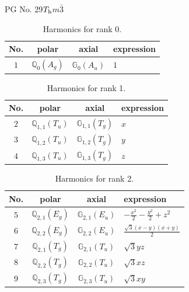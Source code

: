 \documentclass[fleqn,8pt,landscape]{jsarticle}
\begin{document}
\setcounter{MaxMatrixCols}{32}

\renewcommand{\tablename}{Table~}
\renewcommand{\figurename}{Figure~}
\begin{center}
\LARGE
PG No. 29\quad$T_{\rm h}$\quad$m\bar{3}$\quad[ cubic ]
\end{center}
\begin{table}[ht!]
\begin{center}
\caption{Harmonics for rank 0.}
\renewcommand{\arraystretch}{1.3}
\begin{tabular}{cccl} \hline \hline
No. & polar & axial & expression \\ \hline
$ 1 $ & $ \mathbb{Q}_{0}(A_{g}) $ & $ \mathbb{G}_{0}(A_{u}) $ & $ 1 $ \\
 \hline \hline
\end{tabular}
\end{center}
\end{table}
\begin{table}[ht!]
\begin{center}
\caption{Harmonics for rank 1.}
\renewcommand{\arraystretch}{1.3}
\begin{tabular}{cccl} \hline \hline
No. & polar & axial & expression \\ \hline
$ 2 $ & $ \mathbb{Q}_{1,1}(T_{u}) $ & $ \mathbb{G}_{1,1}(T_{g}) $ & $ x $ \\
$ 3 $ & $ \mathbb{Q}_{1,2}(T_{u}) $ & $ \mathbb{G}_{1,2}(T_{g}) $ & $ y $ \\
$ 4 $ & $ \mathbb{Q}_{1,3}(T_{u}) $ & $ \mathbb{G}_{1,3}(T_{g}) $ & $ z $ \\
 \hline \hline
\end{tabular}
\end{center}
\end{table}
\begin{table}[ht!]
\begin{center}
\caption{Harmonics for rank 2.}
\renewcommand{\arraystretch}{1.3}
\begin{tabular}{cccl} \hline \hline
No. & polar & axial & expression \\ \hline
$ 5 $ & $ \mathbb{Q}_{2,1}(E_{g}) $ & $ \mathbb{G}_{2,1}(E_{u}) $ & $ - \frac{x^{2}}{2} - \frac{y^{2}}{2} + z^{2} $ \\
$ 6 $ & $ \mathbb{Q}_{2,2}(E_{g}) $ & $ \mathbb{G}_{2,2}(E_{u}) $ & $ \frac{\sqrt{3} \left(x - y\right) \left(x + y\right)}{2} $ \\
$ 7 $ & $ \mathbb{Q}_{2,1}(T_{g}) $ & $ \mathbb{G}_{2,1}(T_{u}) $ & $ \sqrt{3} y z $ \\
$ 8 $ & $ \mathbb{Q}_{2,2}(T_{g}) $ & $ \mathbb{G}_{2,2}(T_{u}) $ & $ \sqrt{3} x z $ \\
$ 9 $ & $ \mathbb{Q}_{2,3}(T_{g}) $ & $ \mathbb{G}_{2,3}(T_{u}) $ & $ \sqrt{3} x y $ \\
 \hline \hline
\end{tabular}
\end{center}
\end{table}
\end{document}
